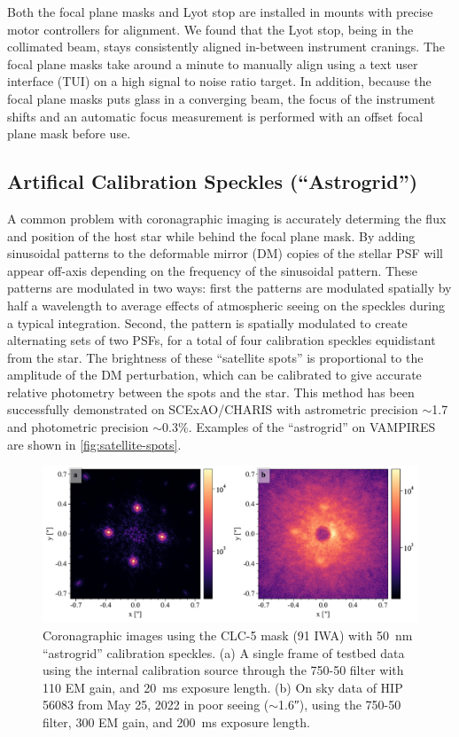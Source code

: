 \documentclass[]{spie}  %
\begin{document}
Both the focal plane masks and Lyot stop are installed in mounts with precise motor controllers for alignment. We found that the Lyot stop, being in the collimated beam, stays consistently aligned in-between instrument cranings. The focal plane masks take around a minute to manually align using a text user interface (TUI) on a high signal to noise ratio target. In addition, because the focal plane masks puts glass in a converging beam, the focus of the instrument shifts and an automatic focus measurement is performed with an offset focal plane mask before use.

\subsection{Artifical Calibration Speckles (``Astrogrid'')}

A common problem with coronagraphic imaging is accurately determing the flux and position of the host star while behind the focal plane mask. By adding sinusoidal patterns to the deformable mirror (DM) copies of the stellar PSF will appear off-axis depending on the frequency of the sinusoidal pattern\cite{sahoo2020}. These patterns are modulated in two ways: first the patterns are modulated spatially by half a wavelength to average effects of atmospheric seeing on the speckles during a typical integration. Second, the pattern is spatially modulated to create alternating sets of two PSFs, for a total of four calibration speckles equidistant from the star. The brightness of these ``satellite spots'' is proportional to the amplitude of the DM perturbation, which can be calibrated to give accurate relative photometry between the spots and the star. This method has been successfully demonstrated on SCExAO/CHARIS with astrometric precision $\sim$\qty{1.7}{\milliarcsecond} and photometric precision $\sim$0.3\%\cite{currie2020}. Examples of the ``astrogrid'' on VAMPIRES are shown in \autoref{fig:satellite-spots}.

\begin{figure}
   \centering
   \includegraphics[width=\textwidth]{figures/astrogrid_psf}
   \caption{Coronagraphic images using the CLC-5 mask (\qty{91}{\milliarcsecond} IWA) with \qty{50}{\nano\meter} ``astrogrid'' calibration speckles. (a) A single frame of testbed data using the internal calibration source through the 750-50 filter with 110 EM gain, and \qty{20}{\milli\second} exposure length. (b) On sky data of HIP 56083 from May 25, 2022 in poor seeing ($\sim$\ang{;;1.6}), using the 750-50 filter, 300 EM gain, and \qty{200}{\milli\second} exposure length.}\label{fig:satellite-spots}
\end{figure}
\end{document}
